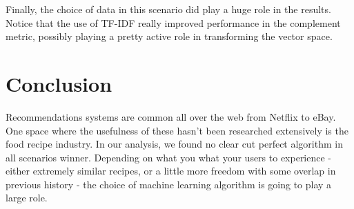 \documentclass[11pt]{article}
\begin{document}
Finally, the choice of data in this scenario did play a huge role in the results. Notice that the use of TF-IDF really improved performance in the complement metric, possibly playing a pretty active role in transforming the vector space.  

\section{Conclusion}

Recommendations systems are common all over the web from Netflix to eBay. One space where the usefulness of these hasn't been researched extensively is the food recipe industry. In our analysis, we found no clear cut perfect algorithm in all scenarios winner. Depending on what you what your users to experience - either extremely similar recipes, or a little more freedom with some overlap in previous history - the choice of machine learning algorithm is going to play a large role. 


\end{document}
